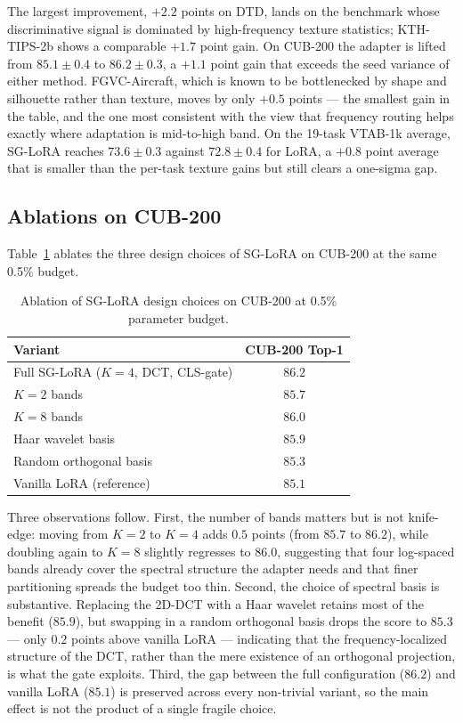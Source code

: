 \documentclass{article}
\begin{document}
The largest improvement, $+2.2$ points on DTD, lands on the benchmark whose discriminative signal is dominated by high-frequency texture statistics; KTH-TIPS-2b shows a comparable $+1.7$ point gain. On CUB-200 the adapter is lifted from $85.1 \pm 0.4$ to $86.2 \pm 0.3$, a $+1.1$ point gain that exceeds the seed variance of either method. FGVC-Aircraft, which is known to be bottlenecked by shape and silhouette rather than texture, moves by only $+0.5$ points — the smallest gain in the table, and the one most consistent with the view that frequency routing helps exactly where adaptation is mid-to-high band. On the 19-task VTAB-1k average, SG-LoRA reaches $73.6 \pm 0.3$ against $72.8 \pm 0.4$ for LoRA, a $+0.8$ point average that is smaller than the per-task texture gains but still clears a one-sigma gap.

\subsection{Ablations on CUB-200}

Table~\ref{tab:ablation} ablates the three design choices of SG-LoRA on CUB-200 at the same 0.5\% budget.

\begin{table}[t]
\centering
\caption{Ablation of SG-LoRA design choices on CUB-200 at 0.5\% parameter budget.}
\label{tab:ablation}
\begin{tabular}{lc}
\toprule
Variant & CUB-200 Top-1 \\
\midrule
Full SG-LoRA ($K{=}4$, DCT, CLS-gate) & $86.2$ \\
$K{=}2$ bands                          & $85.7$ \\
$K{=}8$ bands                          & $86.0$ \\
Haar wavelet basis                     & $85.9$ \\
Random orthogonal basis                & $85.3$ \\
Vanilla LoRA (reference)               & $85.1$ \\
\bottomrule
\end{tabular}
\end{table}

Three observations follow. First, the number of bands matters but is not knife-edge: moving from $K{=}2$ to $K{=}4$ adds $0.5$ points (from $85.7$ to $86.2$), while doubling again to $K{=}8$ slightly regresses to $86.0$, suggesting that four log-spaced bands already cover the spectral structure the adapter needs and that finer partitioning spreads the budget too thin. Second, the choice of spectral basis is substantive. Replacing the 2D-DCT with a Haar wavelet retains most of the benefit ($85.9$), but swapping in a random orthogonal basis drops the score to $85.3$ — only $0.2$ points above vanilla LoRA — indicating that the frequency-localized structure of the DCT, rather than the mere existence of an orthogonal projection, is what the gate exploits. Third, the gap between the full configuration ($86.2$) and vanilla LoRA ($85.1$) is preserved across every non-trivial variant, so the main effect is not the product of a single fragile choice.
\end{document}
